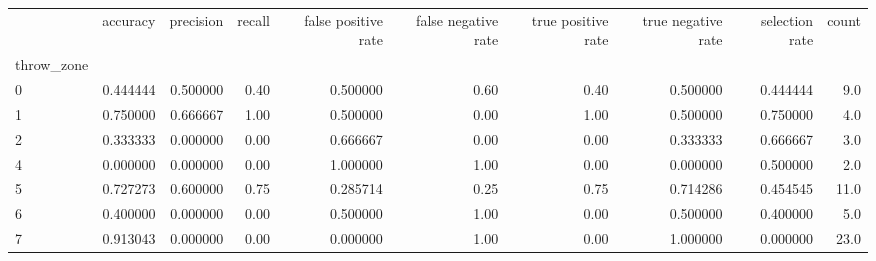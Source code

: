 \begin{tabular}{lrrrrrrrrr}
\toprule
{} &  accuracy &  precision &  recall &  false positive rate &  false negative rate &  true positive rate &  true negative rate &  selection rate &  count \\
throw\_zone &           &            &         &                      &                      &                     &                     &                 &        \\
\midrule
0          &  0.444444 &   0.500000 &    0.40 &             0.500000 &                 0.60 &                0.40 &            0.500000 &        0.444444 &    9.0 \\
1          &  0.750000 &   0.666667 &    1.00 &             0.500000 &                 0.00 &                1.00 &            0.500000 &        0.750000 &    4.0 \\
2          &  0.333333 &   0.000000 &    0.00 &             0.666667 &                 0.00 &                0.00 &            0.333333 &        0.666667 &    3.0 \\
4          &  0.000000 &   0.000000 &    0.00 &             1.000000 &                 1.00 &                0.00 &            0.000000 &        0.500000 &    2.0 \\
5          &  0.727273 &   0.600000 &    0.75 &             0.285714 &                 0.25 &                0.75 &            0.714286 &        0.454545 &   11.0 \\
6          &  0.400000 &   0.000000 &    0.00 &             0.500000 &                 1.00 &                0.00 &            0.500000 &        0.400000 &    5.0 \\
7          &  0.913043 &   0.000000 &    0.00 &             0.000000 &                 1.00 &                0.00 &            1.000000 &        0.000000 &   23.0 \\
\bottomrule
\end{tabular}
